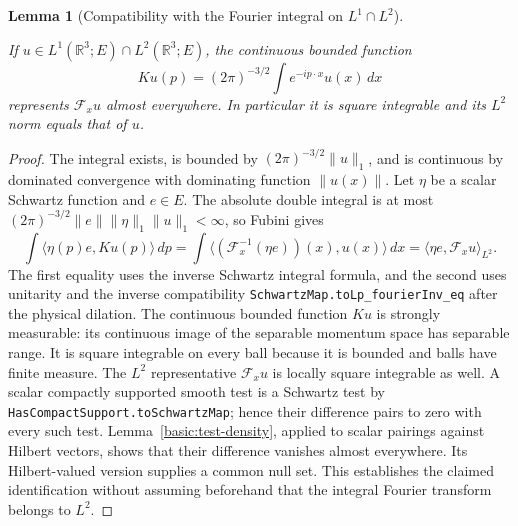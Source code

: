 \documentclass[11pt,a4paper]{article}
\newtheorem{lemma}[theorem]{Lemma}
\theoremstyle{definition}
\theoremstyle{remark}
\newcommand{\proofid}[1]{\par\smallskip{\normalfont\scriptsize\color{inkblue}Stable ID: \nolinkurl{#1}}\par\smallskip}
\begin{document}
\begin{lemma}[Compatibility with the Fourier integral on $L^1\cap L^2$]
\label{basic:fourier-integral-compat}
\proofid{basic:fourier-integral-compat}
\par{}\par\smallskip

If $u\in L^1(\mathbb R^3;E)\cap L^2(\mathbb R^3;E)$, the continuous
bounded function
\[
 Ku(p)=(2\pi)^{-3/2}\int e^{-ip\cdot x}u(x)\,dx
\]
represents $\mathcal F_xu$ almost everywhere. In particular it is
square integrable and its $L^2$ norm equals that of $u$.
\end{lemma}
\begin{proof}
The integral exists, is bounded by $(2\pi)^{-3/2}\|u\|_1$, and is
continuous by dominated convergence with dominating function
$\|u(x)\|$. Let $\eta$ be a scalar Schwartz function and $e\in E$.
The absolute double integral is at most
$(2\pi)^{-3/2}\|e\|\|\eta\|_1\|u\|_1<\infty$, so Fubini gives
\[
 \int\langle\eta(p)e,Ku(p)\rangle\,dp
 =\int\langle(\mathcal F_x^{-1}(\eta e))(x),u(x)\rangle\,dx
 =\langle\eta e,\mathcal F_xu\rangle_{L^2}.
\]
The first equality uses the inverse Schwartz integral formula, and
the second uses unitarity and the inverse compatibility
\nolinkurl{SchwartzMap.toLp_fourierInv_eq} after the physical dilation.
The continuous bounded function $Ku$ is strongly measurable: its
continuous image of the separable momentum space has separable range.
It is square integrable on every ball because it is bounded and balls
have finite measure. The $L^2$ representative $\mathcal F_xu$ is
locally square integrable as well. A scalar compactly supported smooth
test is a Schwartz test by
\nolinkurl{HasCompactSupport.toSchwartzMap}; hence their difference
pairs to zero with every such test.
Lemma~\ref{basic:test-density}, applied to scalar pairings against
Hilbert vectors, shows that their difference vanishes almost everywhere.
Its Hilbert-valued version supplies a common null set. This establishes
the claimed identification without assuming beforehand that the
integral Fourier transform belongs to $L^2$.
\end{proof}
\end{document}
